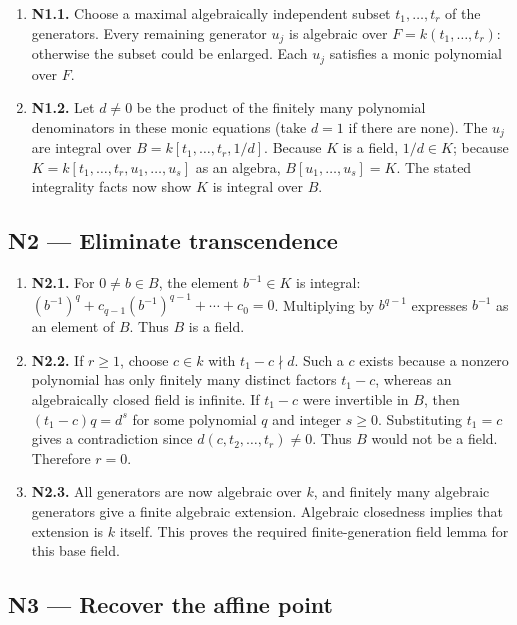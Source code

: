 \documentclass[preprint,12pt,aps,pra,showkeys,amsmath,amssymb,superscriptaddress,floatfix]{revtex4-2}
\theoremstyle{definition}
\theoremstyle{remark}
\begin{document}
\begin{enumerate}
\def\labelenumi{\arabic{enumi}.}
\item
  \textbf{N1.1.} Choose a maximal algebraically independent subset
  \(t_1,\ldots,t_r\) of the generators. Every remaining generator
  \(u_j\) is algebraic over \(F=k(t_1,\ldots,t_r)\): otherwise the
  subset could be enlarged. Each \(u_j\) satisfies a monic polynomial
  over \(F\).
\item
  \textbf{N1.2.} Let \(d\ne0\) be the product of the finitely many
  polynomial denominators in these monic equations (take \(d=1\) if
  there are none). The \(u_j\) are integral over
  \(B=k[t_1,\ldots,t_r,1/d]\). Because \(K\) is a field, \(1/d\in K\);
  because \(K=k[t_1,\ldots,t_r,u_1,\ldots,u_s]\) as an algebra,
  \(B[u_1,\ldots,u_s]=K\). The stated integrality facts now show \(K\)
  is integral over \(B\).
\end{enumerate}

\subsection{N2 --- Eliminate
transcendence}\label{n2-eliminate-transcendence}

\begin{enumerate}
\def\labelenumi{\arabic{enumi}.}
\item
  \textbf{N2.1.} For \(0\ne b\in B\), the element \(b^{-1}\in K\) is
  integral: \((b^{-1})^q+c_{q-1}(b^{-1})^{q-1}+\cdots+c_0=0\).
  Multiplying by \(b^{q-1}\) expresses \(b^{-1}\) as an element of
  \(B\). Thus \(B\) is a field.
\item
  \textbf{N2.2.} If \(r\ge1\), choose \(c\in k\) with \(t_1-c\nmid d\).
  Such a \(c\) exists because a nonzero polynomial has only finitely
  many distinct factors \(t_1-c\), whereas an algebraically closed field
  is infinite. If \(t_1-c\) were invertible in \(B\), then
  \((t_1-c)q=d^s\) for some polynomial \(q\) and integer \(s\ge0\).
  Substituting \(t_1=c\) gives a contradiction since
  \(d(c,t_2,\ldots,t_r)\ne0\). Thus \(B\) would not be a field.
  Therefore \(r=0\).
\item
  \textbf{N2.3.} All generators are now algebraic over \(k\), and
  finitely many algebraic generators give a finite algebraic extension.
  Algebraic closedness implies that extension is \(k\) itself. This
  proves the required finite-generation field lemma for this base field.
\end{enumerate}

\subsection{N3 --- Recover the affine
point}\label{n3-recover-the-affine-point}
\end{document}
